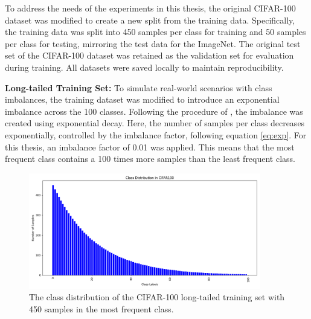To address the needs of the experiments in this thesis, the original CIFAR-100 dataset was modified to create a new split from the training data. Specifically, the training data was split into 450 samples per class for training and 50 samples per class for testing, mirroring the test data for the ImageNet. The original test set of the CIFAR-100 dataset was retained as the validation set for evaluation during training. All datasets were saved locally to maintain reproducibility.



\textbf{Long-tailed Training Set:} To simulate real-world scenarios with class imbalances, the training dataset was modified to introduce an exponential imbalance across the 100 classes. Following the procedure of \cite{cao2019learningimbalanceddatasetslabeldistributionaware}, the imbalance was created using exponential decay. Here, the number of samples per class decreases exponentially, controlled by the imbalance factor, following equation \eqref{eq:exp}. For this thesis, an imbalance factor of 0.01 was applied. This means that the most frequent class contains a 100 times more samples than the least frequent class. 

\begin{figure}[h!]
    \centering
    \includegraphics[width=0.9\textwidth]{Images/Plots/cifar100_train_450_imb.png}
    \caption{The class distribution of the CIFAR-100 long-tailed training set with 450 samples in the most frequent class.}
    \label{fig:cifar100_train_450_imb}
\end{figure}


